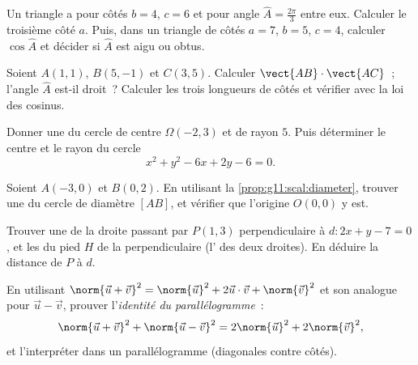 \begin{exercise}[$\star\star$]\label{exo:g11:scal:5}
Un triangle a pour côtés $b = 4$, $c = 6$ et pour angle
$\widehat A = \frac{2\pi}{3}$ entre eux. Calculer le troisième côté $a$.
Puis, dans un triangle de côtés $a = 7$, $b = 5$, $c = 4$, calculer
$\cos\widehat A$ et décider si $\widehat A$ est aigu ou obtus.
\end{exercise}

\begin{exercise}[$\star\star$]\label{exo:g11:scal:6}
Soient $A(1, 1)$, $B(5, -1)$ et $C(3, 5)$. Calculer
$\vect{AB} \cdot \vect{AC}$~; l'angle $\widehat A$ est-il droit~?
Calculer les trois longueurs de côtés et vérifier avec la loi des
cosinus.
\end{exercise}

\begin{exercise}[$\star\star$]\label{exo:g11:scal:7}
Donner une  du cercle de centre $\Omega(-2, 3)$ et de rayon $5$.
Puis déterminer le centre et le rayon du cercle
\[
x^2 + y^2 - 6x + 2y - 6 = 0 .
\]
\end{exercise}

\begin{exercise}[$\star\star$]\label{exo:g11:scal:8}
Soient $A(-3, 0)$ et $B(0, 2)$. En utilisant la
\cref{prop:g11:scal:diameter}, trouver une  du cercle de
diamètre $[AB]$, et vérifier que l'origine $O(0,0)$ y est.
\end{exercise}

\begin{exercise}[$\star\star$]\label{exo:g11:scal:9}
Trouver une  de la droite passant par $P(1, 3)$ perpendiculaire
à $d : 2x + y - 7 = 0$, et les  du pied $H$ de la
perpendiculaire (l' des deux droites). En déduire la
distance de $P$ à $d$.
\end{exercise}

\begin{exercise}[$\star\star$]\label{exo:g11:scal:10}
En utilisant $\norm{\vec u + \vec v}^2 = \norm{\vec u}^2 +
2\vec u\cdot\vec v + \norm{\vec v}^2$ et son analogue pour
$\vec u - \vec v$, prouver l'\emph{identité du parallélogramme}~:
\[
\norm{\vec u + \vec v}^2 + \norm{\vec u - \vec v}^2
= 2\norm{\vec u}^2 + 2\norm{\vec v}^2 ,
\]
et l'interpréter dans un parallélogramme (diagonales contre côtés).
\end{exercise}

